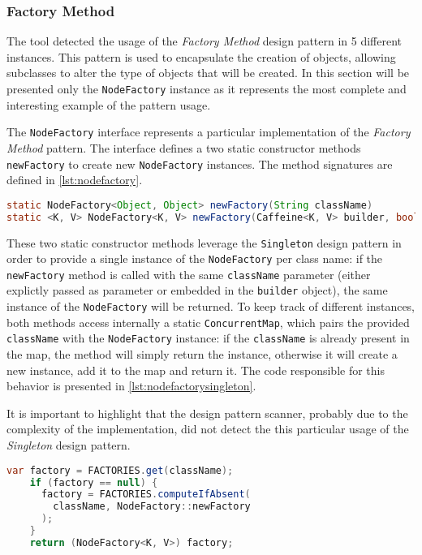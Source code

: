 \subsubsection{Factory Method}
\label{par:nodefactory}

The tool detected the usage of the \textit{Factory Method} design pattern in 5 different instances. This pattern is used to encapsulate the creation of objects, allowing subclasses to alter the type of objects that will be created. In this section will be presented only the \texttt{NodeFactory} instance as it represents the most complete and interesting example of the pattern usage.

The \texttt{NodeFactory} interface represents a particular implementation of the \textit{Factory Method} pattern. The interface defines a two static constructor methods \texttt{newFactory} to create new \texttt{NodeFactory} instances. The method signatures are defined in \autoref{lst:nodefactory}.

\begin{lstlisting}[language=Java, caption={NodeFactory interface static constructor methods}, captionpos=b, label={lst:nodefactory}]
static NodeFactory<Object, Object> newFactory(String className)
static <K, V> NodeFactory<K, V> newFactory(Caffeine<K, V> builder, boolean isAsync)
\end{lstlisting}

\noindent These two static constructor methods leverage the \texttt{Singleton} design pattern in order to provide a single instance of the \texttt{NodeFactory} per class name: if the \texttt{newFactory} method is called with the same \texttt{className} parameter (either explictly passed as parameter or embedded in the \texttt{builder} object), the same instance of the \texttt{NodeFactory} will be returned. To keep track of different instances, both methods access internally a static \texttt{ConcurrentMap}, which pairs the provided \texttt{className} with the \texttt{NodeFactory} instance: if the \texttt{className} is already present in the map, the method will simply return the instance, otherwise it will create a new instance, add it to the map and return it. The code responsible for this behavior is presented in \autoref{lst:nodefactorysingleton}.

It is important to highlight that the design pattern scanner, probably due to the complexity of the implementation, did not detect the this particular usage of the \textit{Singleton} design pattern.

\begin{lstlisting}[language=Java, caption={NodeFactory singleton design pattern implementation using a static \texttt{ConcurrentMap} instance}, captionpos=b, label={lst:nodefactorysingleton}]
    var factory = FACTORIES.get(className);
    if (factory == null) {
      factory = FACTORIES.computeIfAbsent(
        className, NodeFactory::newFactory
      );
    }
    return (NodeFactory<K, V>) factory;
\end{lstlisting}

